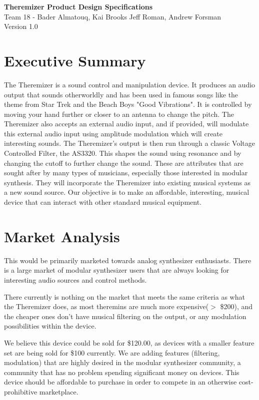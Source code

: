 \documentclass[11pt]{report}
\begin{document}
\begin{center}
	{\LARGE \textbf{Theremizer Product Design Specifications}}\\
	
	Team 18 - Bader Almatouq, Kai Brooks Jeff Roman, Andrew Forsman\\
	Version 1.0
\end{center}


	\section*{Executive Summary}
	The Theremizer is a sound control and manipulation device. It produces an audio output that sounds otherworldly and has been used in famous songs like the theme from Star Trek and the Beach Boys "Good Vibrations". It is controlled by moving your hand further or closer to an antenna to change the pitch. The Theremizer also accepts an external audio input, and if provided, will modulate this external audio input using amplitude modulation which will create interesting sounds. The Theremizer's output is then run through a classic Voltage Controlled Filter, the AS3320. This shapes the sound using resonance and by changing the cutoff to further change the sound. These are attributes that are sought after by many types of musicians, especially those interested in modular synthesis. They will incorporate the Theremizer into existing musical systems as a new sound source. Our objective is to make an affordable, interesting, musical device that can interact with other standard musical equipment. 
	\section*{Market Analysis}
	This would be primarily marketed towards analog synthesizer enthusiasts. There is a large market of modular synthesizer users that are always looking for interesting audio sources and control methods. \par There currently is nothing on the market that meets the same criteria as what the Theremizer does, as most theremins are much more expensive($>$ \$200), and the cheaper ones don't have musical filtering on the output, or any modulation possibilities within the device.
	\par We believe this device could be sold for \$120.00, as devices with a smaller feature set are being sold for \$100 currently. We are adding features (filtering, modulation) that are highly desired in the modular synthesizer community, a community that has no problem spending significant money on devices. This device should be affordable to purchase in order to compete in an otherwise cost-prohibitive marketplace.
\end{document}
